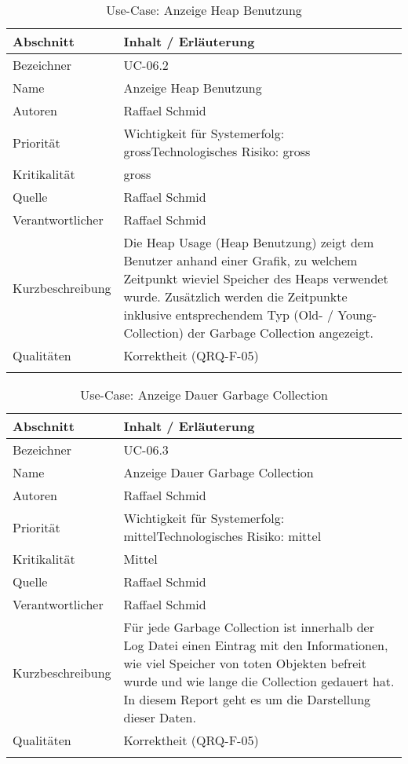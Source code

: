 \begin{longtable}{|p{4cm}|p{10.5cm}|}
\hline
   \textbf{Abschnitt} & \textbf{Inhalt / Erläuterung} \\\hline
   Bezeichner & UC-06.2\\\hline
   Name & Anzeige Heap Benutzung\\\hline
   Autoren & Raffael Schmid\\\hline
   Priorität & Wichtigkeit für Systemerfolg: gross\newline Technologisches Risiko: gross\\\hline
   Kritikalität & gross\\\hline
   Quelle & Raffael Schmid\\\hline
   Verantwortlicher & Raffael Schmid\\\hline
   Kurzbeschreibung & Die Heap Usage (Heap Benutzung) zeigt dem Benutzer anhand einer Grafik, zu welchem Zeitpunkt wieviel Speicher des Heaps verwendet wurde. Zusätzlich werden die Zeitpunkte inklusive entsprechendem Typ (Old- / Young-Collection) der Garbage Collection angezeigt.  \\\hline
   Qualitäten & Korrektheit (QRQ-F-05)\\\hline
\caption{Use-Case: Anzeige Heap Benutzung}
\end{longtable}

\begin{longtable}{|p{4cm}|p{10.5cm}|}
\hline
   \textbf{Abschnitt} & \textbf{Inhalt / Erläuterung} \\\hline
   Bezeichner & UC-06.3\\\hline
   Name & Anzeige Dauer Garbage Collection\\\hline
   Autoren & Raffael Schmid\\\hline
   Priorität & Wichtigkeit für Systemerfolg: mittel\newline Technologisches Risiko: mittel\\\hline
   Kritikalität & Mittel\\\hline
   Quelle & Raffael Schmid\\\hline
   Verantwortlicher & Raffael Schmid\\\hline
   Kurzbeschreibung & Für jede Garbage Collection ist innerhalb der Log Datei einen Eintrag mit den Informationen, wie viel Speicher von toten Objekten befreit wurde und wie lange die Collection gedauert hat. In diesem Report geht es um die Darstellung dieser Daten.\\\hline
   Qualitäten & Korrektheit (QRQ-F-05)\\\hline
\caption{Use-Case: Anzeige Dauer Garbage Collection}
\end{longtable}

